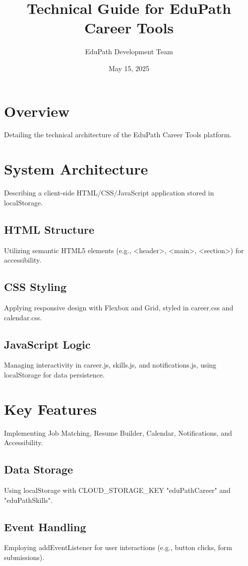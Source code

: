 \documentclass[a4paper,12pt]{article}
\title{Technical Guide for EduPath Career Tools}
\author{EduPath Development Team}
\date{May 15, 2025}
\begin{document}
\maketitle

\section*{Overview}
Detailing the technical architecture of the EduPath Career Tools platform.

\section{System Architecture}
Describing a client-side HTML/CSS/JavaScript application stored in localStorage.

\subsection{HTML Structure}
Utilizing semantic HTML5 elements (e.g., <header>, <main>, <section>) for accessibility.

\subsection{CSS Styling}
Applying responsive design with Flexbox and Grid, styled in career.css and calendar.css.

\subsection{JavaScript Logic}
Managing interactivity in career.js, skills.js, and notifications.js, using localStorage for data persistence.

\section{Key Features}
Implementing Job Matching, Resume Builder, Calendar, Notifications, and Accessibility.

\subsection{Data Storage}
Using localStorage with CLOUD_STORAGE_KEY "eduPathCareer" and "eduPathSkills".

\subsection{Event Handling}
Employing addEventListener for user interactions (e.g., button clicks, form submissions).
\end{document}
